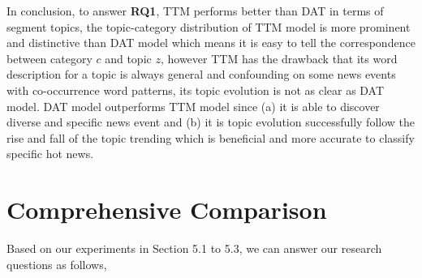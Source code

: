 In conclusion, to answer \textbf{RQ1}, TTM performs better than DAT in terms of segment topics, the topic-category distribution of TTM model is more prominent and distinctive than DAT model which means it is easy to tell the correspondence between category $c$ and topic $z$, however TTM has the drawback that its word description for a topic is always general and confounding on some news events with co-occurrence word patterns, its topic evolution is not as clear as DAT model. DAT model outperforms TTM model since (a) it is able to discover diverse and specific news event and (b) it is topic evolution successfully follow the rise and fall of the topic trending which is beneficial and more accurate to classify specific hot news. 



\section{Comprehensive Comparison}
Based on our experiments in Section 5.1 to 5.3, we can answer our research questions as follows,
